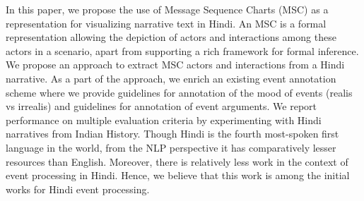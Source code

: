 In this paper, we propose the use of Message Sequence Charts (MSC) as a representation for visualizing narrative text in Hindi. An MSC is a formal representation allowing the depiction of actors and interactions among these actors in a scenario, apart from supporting a rich framework for formal inference. We propose an approach to extract MSC actors and interactions from a Hindi narrative. As a part of the approach, we enrich an existing event annotation scheme where we provide guidelines for annotation of the mood of events (realis vs irrealis) and guidelines for annotation of event arguments. We report performance on multiple evaluation criteria by experimenting with Hindi narratives from Indian History. Though Hindi is the fourth most-spoken first language in the world, from the NLP perspective it has comparatively lesser resources than English. Moreover, there is relatively less work in the context of event processing in Hindi. Hence, we believe that this work is among the initial works for Hindi event processing.

